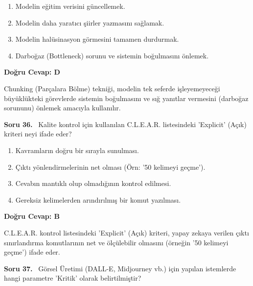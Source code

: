 \documentclass[11pt,a4paper,openany]{book}
\begin{document}
\begin{enumerate}[label=\Alph*), leftmargin=25pt, topsep=4pt, itemsep=2pt]
        \item Modelin eğitim verisini güncellemek.
        \item Modelin daha yaratıcı şiirler yazmasını sağlamak.
        \item Modelin halüsinasyon görmesini tamamen durdurmak.
        \item Darboğaz (Bottleneck) sorunu ve sistemin boğulmasını önlemek.
\end{enumerate}

\vspace{4pt}
\begin{tcolorbox}[title=Cevap ve Açıklama, colback=gray!3!white, colframe=primarycolor!90!black, arc=2mm, fonttitle=\bfseries\sffamily, top=6pt, bottom=6pt]
    \textbf{Doğru Cevap: D}

    \vspace{2pt}
    Chunking (Parçalara Bölme) tekniği, modelin tek seferde işleyemeyeceği büyüklükteki görevlerde sistemin boğulmasını ve sığ yanıtlar vermesini (darboğaz sorununu) önlemek amacıyla kullanılır.
\end{tcolorbox}
\vspace{10pt}
\needspace{5cm}
\vspace{8pt}
\noindent\textbf{\large\sffamily Soru 36.} \ Kalite kontrol için kullanılan C.L.E.A.R. listesindeki 'Explicit' (Açık) kriteri neyi ifade eder?

\begin{enumerate}[label=\Alph*), leftmargin=25pt, topsep=4pt, itemsep=2pt]
        \item Kavramların doğru bir sırayla sunulması.
        \item Çıktı yönlendirmelerinin net olması (Örn: '50 kelimeyi geçme').
        \item Cevabın mantıklı olup olmadığının kontrol edilmesi.
        \item Gereksiz kelimelerden arındırılmış bir komut yazılması.
\end{enumerate}

\vspace{4pt}
\begin{tcolorbox}[title=Cevap ve Açıklama, colback=gray!3!white, colframe=primarycolor!90!black, arc=2mm, fonttitle=\bfseries\sffamily, top=6pt, bottom=6pt]
    \textbf{Doğru Cevap: B}

    \vspace{2pt}
    C.L.E.A.R. kontrol listesindeki 'Explicit' (Açık) kriteri, yapay zekaya verilen çıktı sınırlandırma komutlarının net ve ölçülebilir olmasını (örneğin '50 kelimeyi geçme') ifade eder.
\end{tcolorbox}
\vspace{10pt}
\needspace{5cm}
\vspace{8pt}
\noindent\textbf{\large\sffamily Soru 37.} \ Görsel Üretimi (DALL-E, Midjourney vb.) için yapılan istemlerde hangi parametre 'Kritik' olarak belirtilmiştir?
\end{document}

